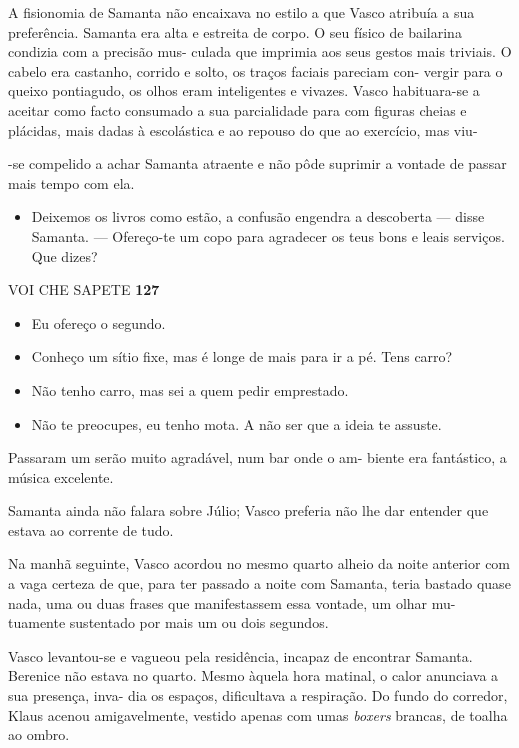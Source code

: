 A fisionomia de Samanta não encaixava no estilo a que Vasco atribuía a
sua preferência. Samanta era alta e estreita de corpo. O seu físico de
bailarina condizia com a precisão mus- culada que imprimia aos seus
gestos mais triviais. O cabelo era castanho, corrido e solto, os traços
faciais pareciam con- vergir para o queixo pontiagudo, os olhos eram
inteligentes e vivazes. Vasco habituara-se a aceitar como facto
consumado a sua parcialidade para com figuras cheias e plácidas, mais
dadas à escolástica e ao repouso do que ao exercício, mas viu-

-se compelido a achar Samanta atraente e não pôde suprimir a vontade de
passar mais tempo com ela.

\begin{itemize}
\tightlist
\item
  Deixemos os livros como estão, a confusão engendra a descoberta ---
  disse Samanta. --- Ofereço-te um copo para agradecer os teus bons e
  leais serviços. Que dizes?
\end{itemize}

VOI CHE SAPETE \textbf{127}

\begin{itemize}
\tightlist
\item
  Eu ofereço o segundo.
\item
  Conheço um sítio fixe, mas é longe de mais para ir a pé. Tens carro?
\item
  Não tenho carro, mas sei a quem pedir emprestado.
\item
  Não te preocupes, eu tenho mota. A não ser que a ideia te assuste.
\end{itemize}

Passaram um serão muito agradável, num bar onde o am- biente era
fantástico, a música excelente.

Samanta ainda não falara sobre Júlio; Vasco preferia não lhe dar
entender que estava ao corrente de tudo.

Na manhã seguinte, Vasco acordou no mesmo quarto alheio da noite
anterior com a vaga certeza de que, para ter passado a noite com
Samanta, teria bastado quase nada, uma ou duas frases que manifestassem
essa vontade, um olhar mu- tuamente sustentado por mais um ou dois
segundos.

Vasco levantou-se e vagueou pela residência, incapaz de encontrar
Samanta. Berenice não estava no quarto. Mesmo àquela hora matinal, o
calor anunciava a sua presença, inva- dia os espaços, dificultava a
respiração. Do fundo do corredor, Klaus acenou amigavelmente, vestido
apenas com umas \emph{boxers }brancas, de toalha ao ombro.

